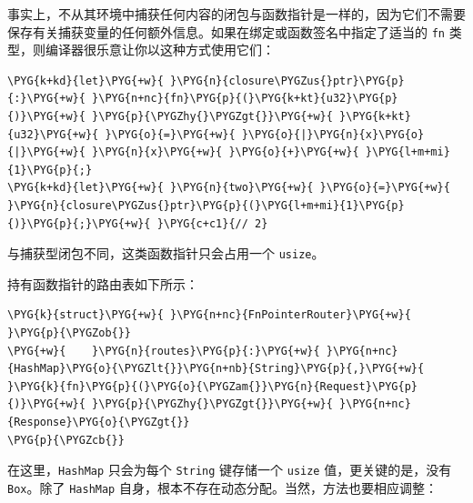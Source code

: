 事实上，不从其环境中捕获任何内容的闭包与函数指针是一样的，因为它们不需要保存有关捕获变量的任何额外信息。如果在绑定或函数签名中指定了适当的 \texttt{fn} 类型，则编译器很乐意让你以这种方式使用它们：

\begin{Verbatim}[commandchars=\\\{\},breaklines=true,breakanywhere=true,fontsize=\codefont,xleftmargin=17bp]
\PYG{k+kd}{let}\PYG{+w}{ }\PYG{n}{closure\PYGZus{}ptr}\PYG{p}{:}\PYG{+w}{ }\PYG{n+nc}{fn}\PYG{p}{(}\PYG{k+kt}{u32}\PYG{p}{)}\PYG{+w}{ }\PYG{p}{\PYGZhy{}\PYGZgt{}}\PYG{+w}{ }\PYG{k+kt}{u32}\PYG{+w}{ }\PYG{o}{=}\PYG{+w}{ }\PYG{o}{|}\PYG{n}{x}\PYG{o}{|}\PYG{+w}{ }\PYG{n}{x}\PYG{+w}{ }\PYG{o}{+}\PYG{+w}{ }\PYG{l+m+mi}{1}\PYG{p}{;}
\PYG{k+kd}{let}\PYG{+w}{ }\PYG{n}{two}\PYG{+w}{ }\PYG{o}{=}\PYG{+w}{ }\PYG{n}{closure\PYGZus{}ptr}\PYG{p}{(}\PYG{l+m+mi}{1}\PYG{p}{)}\PYG{p}{;}\PYG{+w}{ }\PYG{c+c1}{// 2}
\end{Verbatim}

与捕获型闭包不同，这类函数指针只会占用一个 \texttt{usize}。

持有函数指针的路由表如下所示：

\begin{Verbatim}[commandchars=\\\{\},breaklines=true,breakanywhere=true,fontsize=\codefont,xleftmargin=17bp]
\PYG{k}{struct}\PYG{+w}{ }\PYG{n+nc}{FnPointerRouter}\PYG{+w}{ }\PYG{p}{\PYGZob{}}
\PYG{+w}{    }\PYG{n}{routes}\PYG{p}{:}\PYG{+w}{ }\PYG{n+nc}{HashMap}\PYG{o}{\PYGZlt{}}\PYG{n+nb}{String}\PYG{p}{,}\PYG{+w}{ }\PYG{k}{fn}\PYG{p}{(}\PYG{o}{\PYGZam{}}\PYG{n}{Request}\PYG{p}{)}\PYG{+w}{ }\PYG{p}{\PYGZhy{}\PYGZgt{}}\PYG{+w}{ }\PYG{n+nc}{Response}\PYG{o}{\PYGZgt{}}
\PYG{p}{\PYGZcb{}}
\end{Verbatim}

在这里，\texttt{HashMap} 只会为每个 \texttt{String} 键存储一个 \texttt{usize} 值，更关键的是，没有 \texttt{Box}。除了 \texttt{HashMap} 自身，根本不存在动态分配。当然，方法也要相应调整：

